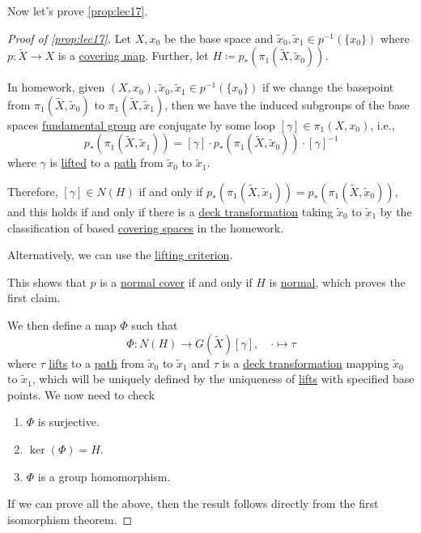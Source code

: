 Now let's prove \autoref{prop:lec17}.
\begin{proof}[Proof of \autoref{prop:lec17}]
	Let \(X, x_0\) be the base space and \(\widetilde{x} _0, \widetilde{x} _1\in p^{-1} (\{x_0\})\) where \(p\colon \widetilde{X} \to X\) is a
	\hyperref[def:covering-map]{covering map}. Further, let \(H\coloneqq p_\ast(\pi _1(\widetilde{X} , \widetilde{x} _0))\).

	In homework, given \((X, x_0), \widetilde{x} _0, \widetilde{x} _1\in p^{-1} (\{x_0\})\) if we change the basepoint from \(\pi _1(\widetilde{X} , \widetilde{x} _0)\)
	to \(\pi _1(\widetilde{X} , \widetilde{x} _1)\), then we have the induced subgroups of the base spaces \hyperref[def:fundamental-group]{fundamental group}
	are conjugate by some loop \([\gamma ]\in \pi _1(X, x_0)\), i.e.,
	\[
		p_\ast (\pi _1(\widetilde{X} , \widetilde{x} _1)) = [\gamma ]\cdot p_\ast (\pi _1(\widetilde{X} , \widetilde{x} _0))\cdot [\gamma ]^{-1}
	\]
	where \(\gamma\) is \hyperref[prop:homotopy-lifting-property]{lifted} to a \hyperref[def:path]{path} from \(\widetilde{x} _0\) to \(\widetilde{x} _1\).

	\par Therefore, \([\gamma ]\in N(H)\) if and only if \(p_\ast(\pi _1(\widetilde{X} , \widetilde{x} _1)) = p_\ast(\pi _1(\widetilde{X} , \widetilde{x} _0))\),
	and this holds if and only if there is a \hyperref[def:deck-transformation]{deck transformation} taking \(\widetilde{x} _0\) to \(\widetilde{x} _1\)
	by the classification of based \hyperref[def:covering-space]{covering spaces} in the homework.
	\begin{note}
		Alternatively, we can use the \hyperref[prop:lifting-criterion]{lifting criterion}.
	\end{note}
	This shows that \(p\) is a \hyperref[def:normal-cover]{normal cover} if and only if \(H\) is \hyperref[def:normal-subgroup]{normal}, which proves the first claim.

	\par We then define a map \(\Phi \) such that
	\[
		\Phi \colon N(H)\to G(\widetilde{X} )[\gamma ],\quad \cdot \mapsto \tau
	\]
	where \(\tau \) \hyperref[prop:homotopy-lifting-property]{lifts} to a \hyperref[def:path]{path} from \(\widetilde{x} _0\) to \(\widetilde{x} _1\) and
	\(\tau \) is a \hyperref[def:deck-transformation]{deck transformation} mapping \(\widetilde{x} _0\) to \(\widetilde{x} _1\), which will be
	uniquely defined by the uniqueness of \hyperref[prop:homotopy-lifting-property]{lifts} with specified base points. We now need to check
	\begin{enumerate}[(1)]
		\item \(\Phi \) is surjective.
		\item \(\ker  (\Phi )= H\).
		\item \(\Phi \) is a group homomorphism.
	\end{enumerate}
	If we can prove all the above, then the result follows directly from the first isomorphism theorem.


\end{proof}
